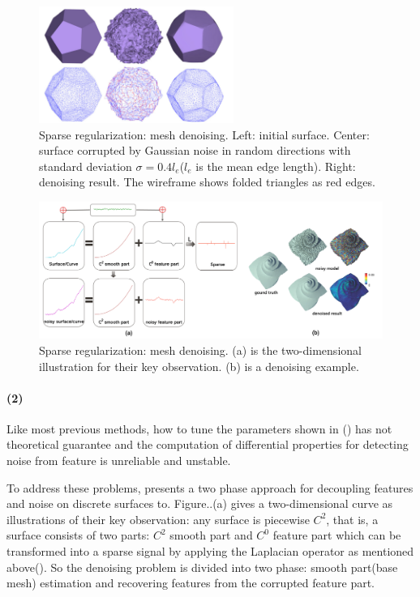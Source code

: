 \begin{figure}[ht]
  \centering
  \includegraphics[width=2.5in]{images/denoise1}
  \caption{Sparse regularization: mesh denoising\cite{he2013mesh}. Left: initial surface. Center: surface corrupted by Gaussian noise in random directions with standard deviation $\sigma=0.4l_{e}$($l_{e}$ is the mean edge length). Right: denoising result. The wireframe shows folded triangles as red edges.}
\end{figure}

\begin{figure}[ht]
  \centering
  \includegraphics[width=5in]{images/denoise2_1}
  \caption{Sparse regularization: mesh denoising\cite{wang2014decoupling}. (a) is the two-dimensional illustration for their key observation. (b) is a denoising example.}
\end{figure}

\paragraph{(2)}
Like most previous methods, how to tune the parameters shown in () has not theoretical guarantee and the computation of differential properties for detecting noise from feature is unreliable and unstable.

To address these problems, \cite{wang2014decoupling} presents a two phase approach for decoupling features and noise on discrete surfaces to.
Figure..(a) gives a two-dimensional curve as illustrations of their key observation: any surface is piecewise $C^2$, that is, a surface consists of two parts: $C^2$ smooth part and $C^0$ feature part which can be transformed into a sparse signal by applying the Laplacian operator as mentioned above().
So the denoising problem is divided into two phase: smooth part(base mesh) estimation and recovering features from the corrupted feature part.

